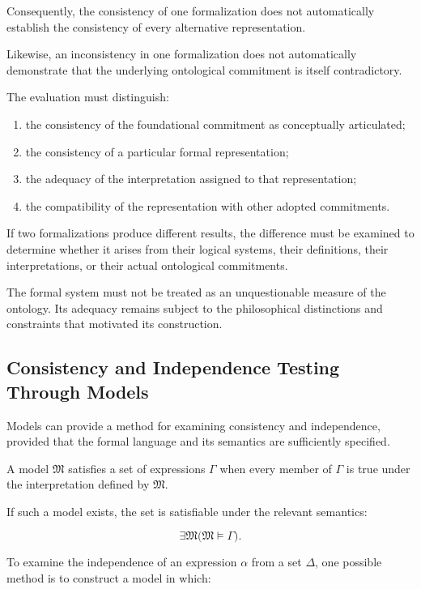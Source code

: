 Consequently, the consistency of one formalization does
not automatically establish the consistency of every
alternative representation.

Likewise, an inconsistency in one formalization does
not automatically demonstrate that the underlying
ontological commitment is itself contradictory.

The evaluation must distinguish:

\begin{enumerate}
    \item the consistency of the foundational commitment
    as conceptually articulated;
    \item the consistency of a particular formal representation;
    \item the adequacy of the interpretation assigned to
    that representation;
    \item the compatibility of the representation with
    other adopted commitments.
\end{enumerate}

If two formalizations produce different results, the
difference must be examined to determine whether it
arises from their logical systems, their definitions,
their interpretations, or their actual ontological
commitments.

The formal system must not be treated as an unquestionable
measure of the ontology. Its adequacy remains subject
to the philosophical distinctions and constraints
that motivated its construction.

\subsection{Consistency and Independence Testing Through Models}

Models can provide a method for examining consistency
and independence, provided that the formal language
and its semantics are sufficiently specified.

A model \(\mathfrak{M}\) satisfies a set of expressions
\(\Gamma\) when every member of \(\Gamma\) is true
under the interpretation defined by \(\mathfrak{M}\).

If such a model exists, the set is satisfiable under
the relevant semantics:

\[
    \exists \mathfrak{M}
    \bigl(\mathfrak{M}\models\Gamma\bigr).
\]

To examine the independence of an expression \(\alpha\)
from a set \(\Delta\), one possible method is to construct
a model in which:

